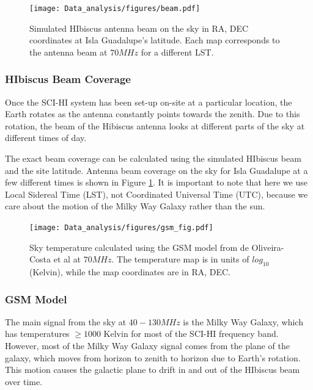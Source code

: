 \begin{figure}[htb]
\begin{center}
\texttt{[image: Data\_analysis/figures/beam.pdf]}
\caption{Simulated HIbiscus antenna beam on the sky in RA, DEC coordinates at Isla Guadalupe's latitude. Each map corresponds to the antenna beam at $70 MHz$ for a different LST. }
\label{Fig:HIbiscus_beam}
\end{center}
\end{figure}

\subsubsection{HIbiscus Beam Coverage}

Once the SCI-HI system has been set-up on-site at a particular location, the Earth rotates as the antenna constantly points towards the zenith. Due to this rotation, the beam of the Hibiscus antenna looks at different parts of the sky at different times of day. 

The exact beam coverage can be calculated using the simulated HIbiscus beam and the site latitude. Antenna beam coverage on the sky for Isla Guadalupe at a few different times is shown in Figure \ref{Fig:HIbiscus_beam}.  It is important to note that here we use Local Sidereal Time (LST), not Coordinated Universal Time (UTC), because we care about the motion of the Milky Way Galaxy rather than the sun.  

\begin{figure}[htb]
\begin{center}
\texttt{[image: Data\_analysis/figures/gsm\_fig.pdf]}
\caption{Sky temperature calculated using the GSM model from de Oliveira-Costa et al \cite{GSM_model} at $70 MHz$. The temperature map is in units of $log_{10}$(Kelvin), while the map coordinates are in RA, DEC. }
\label{Fig:GSM_model}
\end{center}
\end{figure}

\subsubsection{GSM Model}\label{Sec:GSM}

The main signal from the sky at $40-130 MHz$ is the Milky Way Galaxy, which has temperatures $\geq 1000$ Kelvin for most of the SCI-HI frequency band. However, most of the Milky Way Galaxy signal comes from the plane of the galaxy, which moves from horizon to zenith to horizon due to Earth's rotation. This motion causes the galactic plane to drift in and out of the HIbiscus beam over time. 

